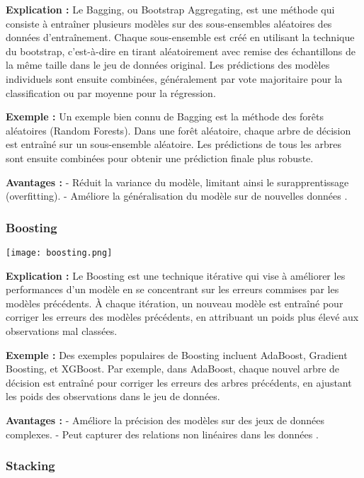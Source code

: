 \documentclass[10pt,a4paper]{article}
\begin{document}
\textbf{Explication :}
Le Bagging, ou Bootstrap Aggregating, est une méthode qui consiste à entraîner plusieurs modèles sur des sous-ensembles aléatoires des données d'entraînement. Chaque sous-ensemble est créé en utilisant la technique du bootstrap, c'est-à-dire en tirant aléatoirement avec remise des échantillons de la même taille dans le jeu de données original. Les prédictions des modèles individuels sont ensuite combinées, généralement par vote majoritaire pour la classification ou par moyenne pour la régression.

\textbf{Exemple :}
Un exemple bien connu de Bagging est la méthode des forêts aléatoires (Random Forests). Dans une forêt aléatoire, chaque arbre de décision est entraîné sur un sous-ensemble aléatoire. Les prédictions de tous les arbres sont ensuite combinées pour obtenir une prédiction finale plus robuste.

\textbf{Avantages :}
- Réduit la variance du modèle, limitant ainsi le surapprentissage (overfitting).
- Améliore la généralisation du modèle sur de nouvelles données \cite{ibm_ensemble}.

\subsubsection*{Boosting}

\texttt{[image: boosting.png]}

\textbf{Explication :}
Le Boosting est une technique itérative qui vise à améliorer les performances d'un modèle en se concentrant sur les erreurs commises par les modèles précédents. À chaque itération, un nouveau modèle est entraîné pour corriger les erreurs des modèles précédents, en attribuant un poids plus élevé aux observations mal classées.

\textbf{Exemple :}
Des exemples populaires de Boosting incluent AdaBoost, Gradient Boosting, et XGBoost. Par exemple, dans AdaBoost, chaque nouvel arbre de décision est entraîné pour corriger les erreurs des arbres précédents, en ajustant les poids des observations dans le jeu de données.

\textbf{Avantages :}
- Améliore la précision des modèles sur des jeux de données complexes.
- Peut capturer des relations non linéaires dans les données \cite{ieee_ensemble}.

\subsubsection*{Stacking}
\end{document}
